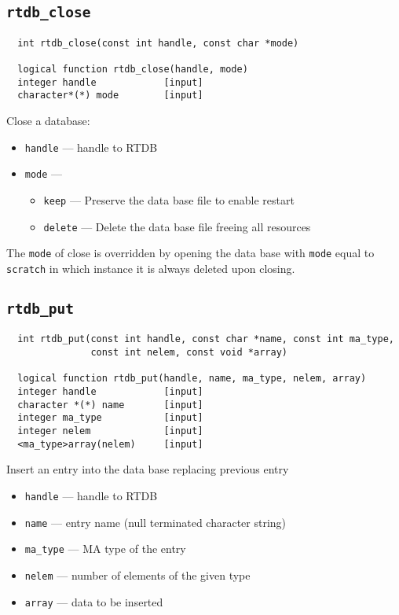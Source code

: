 \subsection{{\tt rtdb\_close}}
\begin{verbatim}
  int rtdb_close(const int handle, const char *mode)

  logical function rtdb_close(handle, mode)
  integer handle            [input]
  character*(*) mode        [input]
\end{verbatim}
Close a database:
\begin{itemize}
\item {\tt handle} --- handle to RTDB
\item {\tt mode} ---
\begin{itemize}
\item {\tt keep} ---    Preserve the data base file to enable restart
\item {\tt delete} ---  Delete the data base file freeing all resources
\end{itemize}
\end{itemize}
The {\tt mode} of close is overridden by opening the data base with
{\tt mode} equal to {\tt scratch} in which instance it is always
deleted upon closing.

\subsection{{\tt rtdb\_put}}
\begin{verbatim}
  int rtdb_put(const int handle, const char *name, const int ma_type,
               const int nelem, const void *array)

  logical function rtdb_put(handle, name, ma_type, nelem, array)
  integer handle            [input]
  character *(*) name       [input]
  integer ma_type           [input]
  integer nelem             [input]
  <ma_type>array(nelem)     [input]
\end{verbatim}
Insert an entry into the data base replacing previous entry
\begin{itemize}
\item {\tt handle} --- handle to RTDB
\item {\tt name} --- entry name (null terminated character string)
\item {\tt ma\_type} --- MA type of the entry
\item {\tt nelem} --- number of elements of the given type
\item {\tt array} --- data to be inserted
\end{itemize}

